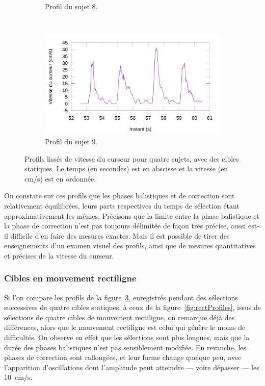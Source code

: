 \begin{figure}[!htb]
\begin{subfigure}[t]{\subImgWlineplot}
			\caption{Profil du sujet 8.}
			\label{fig:staticProfile8}
		\end{subfigure}
		~
		\begin{subfigure}[t]{\subImgWlineplot}
			\centering
			\includegraphics[width=\textwidth]{figures/ch4/subject_09_static_condition_smoothed}
			\caption{Profil du sujet 9.}
			\label{fig:staticProfile9}
		\end{subfigure}
		\caption[Profils de vitesse du curseur, cibles statiques]{Profils lissés de vitesse du curseur pour quatre sujets, avec des cibles statiques. Le temps (en secondes) est en abscisse et la vitesse (en cm/s) est en ordonnée.}
		\label{fig:staticProfiles}
	\end{figure}
	
	On constate sur ces profils que les phases balistiques et de correction sont relativement équilibrées, leurs parts respectives du temps de sélection étant approximativement les mêmes. Précisons que la limite entre la phase balistique et la phase de correction n'est pas toujours délimitée de façon très précise, aussi est-il difficile d'en faire des mesures exactes. Mais il est possible de tirer des enseignements d'un examen visuel des profils, ainsi que de mesures quantitatives et précises de la vitesse du curseur.
	
	\subsubsection{Cibles en mouvement rectiligne}
	Si l'on compare les profils de la figure~\ref{fig:staticProfiles}, enregistrés pendant des sélections successives de quatre cibles statiques, à ceux de la figure~\ref{fig:rectProfiles}, issus de sélections de quatre cibles de mouvement rectiligne, on remarque déjà des différences, alors que le mouvement rectiligne est celui qui génère le moins de difficultés. On observe en effet que les sélections sont plus longues, mais que la durée des phases balistiques n'est pas sensiblement modifiée. En revanche, les phases de correction sont rallongées, et leur forme change quelque peu, avec l'apparition d'oscillations dont l'amplitude peut atteindre --- voire dépasser --- les 10~cm/s.
	
